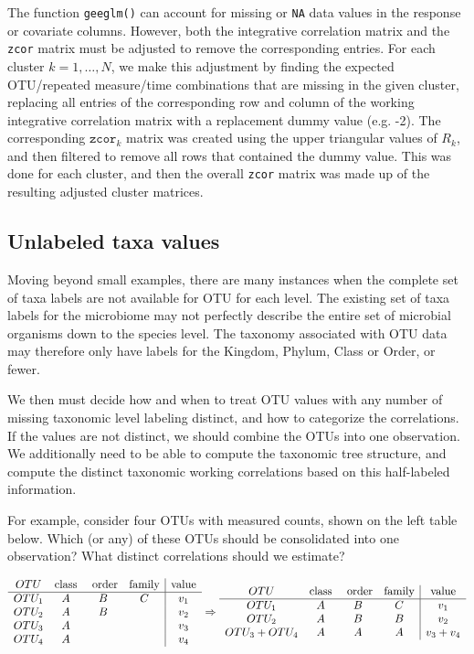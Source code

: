 \documentclass[12pt]{article}
\begin{document}
The function \texttt{geeglm()} can account for missing or \texttt{NA} data values in the response or covariate columns. However, both the integrative correlation matrix and the \texttt{zcor} matrix must be adjusted to remove the corresponding entries. For each cluster $k = 1, \ldots , N$, we make this adjustment by finding the expected OTU/repeated measure/time combinations that are missing in the given cluster, replacing all entries of the corresponding row and column of the working integrative correlation matrix with a replacement dummy value (e.g. -2). The corresponding $\texttt{zcor}_k$ matrix was created using the upper triangular values of $R_k$, and then filtered to remove all rows that contained the dummy value. This was done for each cluster, and then the overall \texttt{zcor} matrix was made up of the resulting adjusted cluster matrices.


\subsection{Unlabeled taxa values}

Moving beyond small examples, there are many instances when the complete set of taxa labels are not available for OTU for each level. The existing set of taxa labels for the microbiome may not perfectly describe the entire set of microbial organisms down to the species level. The taxonomy associated with OTU data may therefore only have labels for the Kingdom, Phylum, Class or Order, or fewer.

We then must decide how and when to treat OTU values with any number of missing taxonomic level labeling distinct, and how to categorize the correlations. If the values are not distinct, we should combine the OTUs into one observation. We additionally need to be able to compute the taxonomic tree structure, and compute the distinct taxonomic working correlations based on this half-labeled information.

For example, consider four OTUs with measured counts, shown on the left table below. Which (or any) of these OTUs should be consolidated into one observation? What distinct correlations should we estimate?

\begin{singlespace}
$$\begin{array}{c c c c | c }
  OTU & \text{class} & \text{ order} & \text{family} & \text{value}\\
  \hline
  OTU_1 & A & B & C & v_1\\
  OTU_2 & A & B & & v_2\\
  OTU_3 & A & & & v_3 \\
  OTU_4 & A & & & v_4
\end{array}
\Rightarrow
\begin{array}{c c c c | c }
  OTU & \text{class} & \text{ order} & \text{family} & \text{value}\\
  \hline
  OTU_1 & A & B & C & v_1\\
  OTU_2 & A & B & B & v_2\\
  OTU_3 + OTU_4 & A & A & A & v_3 + v_4
\end{array}
 $$
\end{singlespace}
\end{document}
